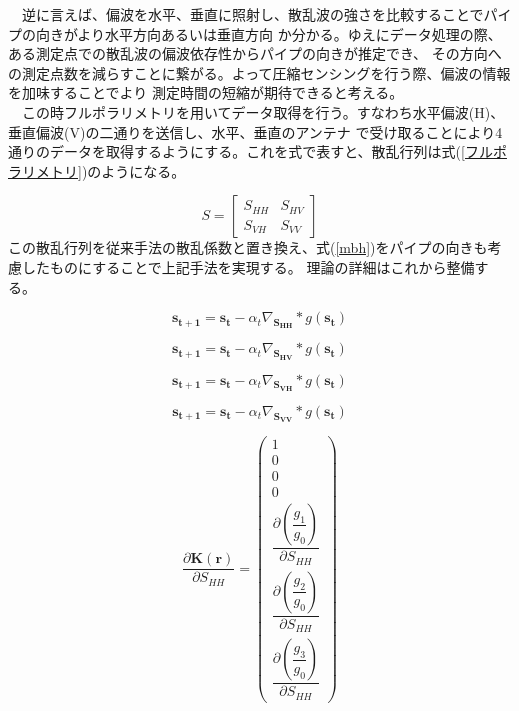 \documentclass[12pt,a4paper]{jsreport}
\begin{document}
　逆に言えば、偏波を水平、垂直に照射し、散乱波の強さを比較することでパイプの向きがより水平方向あるいは垂直方向
か分かる。ゆえにデータ処理の際、ある測定点での散乱波の偏波依存性からパイプの向きが推定でき、
その方向への測定点数を減らすことに繋がる。よって圧縮センシングを行う際、偏波の情報を加味することでより
測定時間の短縮が期待できると考える。
\\　この時フルポラリメトリを用いてデータ取得を行う。すなわち水平偏波(H)、垂直偏波(V)の二通りを送信し、水平、垂直のアンテナ
で受け取ることにより4通りのデータを取得するようにする。これを式で表すと、散乱行列は式(\ref{フルポラリメトリ})のようになる。

\begin{equation}
  S =
      \left[
      \begin{array}{rrr}
      S_{HH} & S_{HV}  \\
      S_{VH} & S_{VV} 
      
      \end{array}
      \right]\label{フルポラリメトリ}
  \end{equation}
この散乱行列を従来手法の散乱係数と置き換え、式(\ref{mbh})をパイプの向きも考慮したものにすることで上記手法を実現する。
理論の詳細はこれから整備する。



\begin{equation}
  \bm{s_{t+1}}=\bm{s_{t}}-\alpha_{t}\nabla_{\bm{S_{HH}}}*g(\bm{s_{t}})
  \end{equation}

\begin{equation}
  \bm{s_{t+1}}=\bm{s_{t}}-\alpha_{t}\nabla_{\bm{S_{HV}}}*g(\bm{s_{t}})
  \end{equation}

\begin{equation}
  \bm{s_{t+1}}=\bm{s_{t}}-\alpha_{t}\nabla_{\bm{S_{VH}}}*g(\bm{s_{t}})
  \end{equation}

\begin{equation}
  \bm{s_{t+1}}=\bm{s_{t}}-\alpha_{t}\nabla_{\bm{S_{VV}}}*g(\bm{s_{t}})
  \end{equation}     



  \begin{equation}
    \frac{\partial \bm{K({\bm{r}})}}{\partial S_{HH}} 
    = \begin{pmatrix} 1 \\ 0 \\ 0 \\ 0 \\  \dfrac{\partial (\dfrac{g_{1}}{g_{0}})}{\partial S_{HH}}  \\  \dfrac{\partial (\dfrac{g_{2}}{g_{0}})}{\partial S_{HH}} \\  \dfrac{\partial (\dfrac{g_{3}}{g_{0}})}{\partial S_{HH}} \end{pmatrix}
    \label{polarimetricdiffSHH}
    \end{equation}
\end{document}
